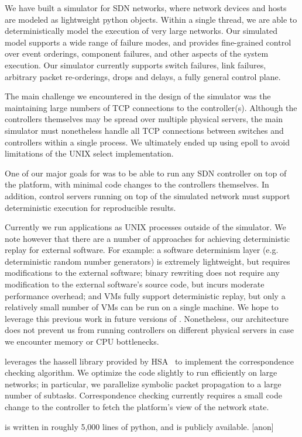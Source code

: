  We have built a simulator for SDN networks,
where network devices and hosts are modeled as lightweight python objects. Within a single thread, we
are able to deterministically model the execution of very large networks.
Our simulated model supports a wide
range of failure modes, and provides fine-grained control over event
orderings, component failures, and other aspects of the system execution. Our
simulator currently supports switch failures, link failures, arbitrary packet
re-orderings, drops and delays, a fully general control plane.

The main challenge we encountered in the design of the simulator was the
maintaining large numbers of TCP connections to the
controller(s). Although the controllers themselves may be spread
over multiple physical servers, the main simulator must nonetheless handle all
TCP connections between switches and controllers within a single process.
We ultimately ended up using epoll to avoid limitations of the UNIX select
implementation.

 One of our major goals for \projectname{}
was to be able to run any SDN controller on top of the platform, with minimal
code changes to the controllers themselves. In addition, control servers
running on top of the simulated network must support deterministic execution
for reproducible results.

Currently we run applications as UNIX processes outside of the simulator.
We note however that there are a number of approaches for achieving deterministic
replay for external software. For example: a software determinism layer (e.g.
deterministic random number generators) is
extremely lightweight, but requires modifications to the external software;
binary rewriting does not require any modification to the external
software's source code, but incurs moderate performance overhead; and VMs
fully support deterministic replay, but only a relatively small number of VMs can be run
on a single machine. We hope to leverage this previous work in future versions
of \projectname{}. Nonetheless, our architecture does not prevent us from
running controllers on different physical
servers in case we encounter memory or CPU bottlenecks.

\projectname{} leverages the hassell library provided by HSA~\cite{hsa}
to implement the correspondence checking algorithm. We optimize the code
slightly to run efficiently on large networks; in particular, we parallelize
symbolic packet propagation to a large number of subtasks. Correspondence
checking currently requires a small code change to the controller to fetch
the platform's view of the network state.

\projectname{} is written in roughly 5,000 lines of python, and is publicly
available. [anon]
